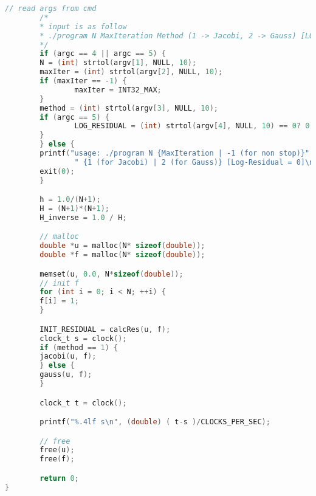 \documentclass[titlepage]{article}
\begin{document}
\begin{lstlisting}[language=c, basicstyle=\small]
        // read args from cmd
        /*
        * input is as follow
        * ./program N MaxIteration Method (1 -> Jacobi, 2 -> Gauss) [LOG]
        */
        if (argc == 4 || argc == 5) {
        N = (int) strtol(argv[1], NULL, 10);
        maxIter = (int) strtol(argv[2], NULL, 10);
        if (maxIter == -1) {
                maxIter = INT32_MAX;
        }
        method = (int) strtol(argv[3], NULL, 10);
        if (argc == 5) {
                LOG_RESIDUAL = (int) strtol(argv[4], NULL, 10) == 0? 0 : 1;
        }
        } else {
        printf("usage: ./program N {MaxIteration | -1 (for non stop)}"
                " {1 (for Jacobi) | 2 (for Gauss)} [Log-Residual = 0]\n");
        exit(0);
        }

        h = 1.0/(N+1);
        H = (N+1)*(N+1);
        H_inverse = 1.0 / H;

        // malloc
        double *u = malloc(N* sizeof(double));
        double *f = malloc(N* sizeof(double));

        memset(u, 0.0, N*sizeof(double));
        // init f
        for (int i = 0; i < N; ++i) {
        f[i] = 1;
        }

        INIT_RESIDUAL = calcRes(u, f);
        clock_t s = clock();
        if (method == 1) {
        jacobi(u, f);
        } else {
        gauss(u, f);
        }

        clock_t t = clock();

        printf("%.4lf s\n", (double) ( t-s )/CLOCKS_PER_SEC);

        // free
        free(u);
        free(f);

        return 0;
}
        
\end{lstlisting}
\end{document}
